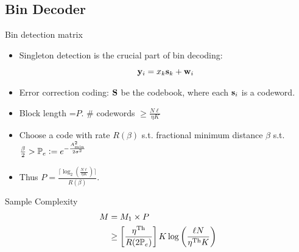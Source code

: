 \documentclass[10pt]{beamer}
\begin{document}
\subsection{Bin Decoder}
\begin{frame}{Bin detection matrix}
\begin{itemize}
\item Singleton detection is the crucial part of bin decoding:
\begin{equation*}
\mathbf{y}_i=x_{k}\mathbf{s}_k +\mathbf{w}_i
\end{equation*} 
\item Error correction coding: $\mathbf{S}$ be the codebook, where each $\mathbf{s}_i$ is a codeword.
\item Block length =$P$.  $\#$ codewords $\geq \frac{N\ell}{\eta K}$
\item Choose a code with rate $R(\beta)$ s.t. fractional minimum distance $\beta$ s.t. $\frac{\beta}{2} >\mathbb{P}_{e}\mathrel{\mathop:}= e^{-\frac{A_{\text{min}}^{2}}{2\sigma^2}}$
\item Thus $P=\frac{\lceil {\log_2(\frac{N\ell}{\eta K})}\rceil}{R(\beta)}$.
\end{itemize} 

\begin{block}{Sample Complexity}
 \begin{align*}
  M&=M_1\times P \\
   &\geq \left[\frac{\eta^{\text{Th}}}{R(2\mathbb{P}_{e})}\right] K\log\left(\frac{\ell N}{\eta^{\text{Th}} K}\right)
\end{align*} 
\end{block}
\end{frame}
\end{document}
